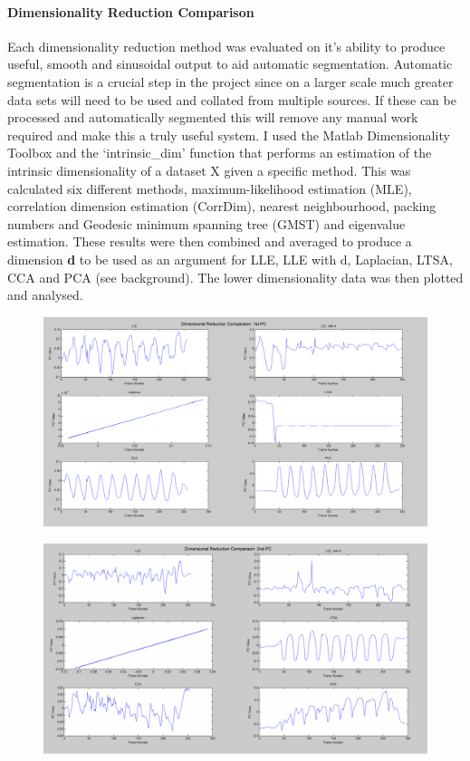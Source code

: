 \paragraph {Dimensionality Reduction Comparison}
Each dimensionality reduction method was evaluated on it's ability to produce useful, smooth and sinusoidal output to aid automatic segmentation. Automatic segmentation is a crucial step in the project since on a larger scale much greater data sets will need to be used and collated from multiple sources. If these can be processed and automatically segmented this will remove any manual work required and make this a truly useful system. I used the Matlab Dimensionality Toolbox and the `intrinsic_dim' function that performs an estimation of the intrinsic dimensionality of a dataset X given a specific method. This was calculated six different methods, maximum-likelihood estimation (MLE), correlation dimension estimation (CorrDim), nearest neighbourhood, packing numbers and Geodesic minimum spanning tree (GMST) and eigenvalue estimation.
These results were then combined and averaged to produce a dimension {\bf d} to be used as an argument for LLE, LLE with d, Laplacian, LTSA, CCA and PCA (see background). The lower dimensionality data was then plotted and analysed.

\begin{figure}[h]
    \centering
    \includegraphics[height=0.25\textheight]{fig04/drcomp.pdf}
    \label{fig:drcomp}
\end{figure}
\begin{figure}[h]
    \centering
    \includegraphics[height=0.25\textheight]{fig04/drcomp2.pdf}
    \label{fig:drcomp}
\end{figure}

